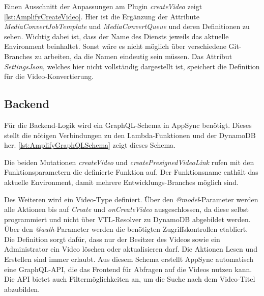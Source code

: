 Einen Ausschnitt der Anpassungen am Plugin \textit{createVideo} zeigt \autoref{lst:AmplifyCreateVideo}. Hier ist die Ergänzung der Attribute \textit{MediaConvertJobTemplate} und \textit{MediaConvertQueue} und deren Definitionen zu sehen. Wichtig dabei ist, dass der Name des Diensts jeweils das aktuelle Environment beinhaltet. Sonst wäre es nicht möglich über verschiedene Git-Branches zu arbeiten, da die Namen eindeutig sein müssen. Das Attribut \textit{SettingsJson}, welches hier nicht vollständig dargestellt ist, speichert die Definition für die Video-Konvertierung.



\subsection{Backend}

Für die Backend-Logik wird ein GraphQL-Schema in AppSync benötigt. Dieses stellt die nötigen Verbindungen zu den Lambda-Funktionen und der DynamoDB her. \autoref{lst:AmplifyGraphQLSchema} zeigt dieses Schema.

Die beiden Mutationen \textit{createVideo} und \textit{createPresignedVideoLink} rufen mit den Funktionsparametern die definierte Funktion auf. Der Funktionsname enthält das aktuelle Environment, damit mehrere Entwicklungs-Branches möglich sind.

Des Weiteren wird ein Video-Type definiert. Über den \textit{@model}-Parameter werden alle Aktionen bis auf \textit{Create} und \textit{onCreateVideo} ausgeschlossen, da diese selbst programmiert und nicht über VTL-Resolver zu DynamoDB abgebildet werden. Über den \textit{@auth}-Parameter werden die benötigten Zugriffskontrollen etabliert. Die Definition sorgt dafür, dass nur der Besitzer des Videos sowie ein Administrator ein Video löschen oder aktualisieren darf. Die Aktionen Lesen und Erstellen sind immer erlaubt. Aus diesem Schema erstellt AppSync automatisch eine GraphQL-API, die das Frontend für Abfragen auf die Videos nutzen kann. Die API bietet auch Filtermöglichkeiten an, um die Suche nach dem Video-Titel abzubilden.



